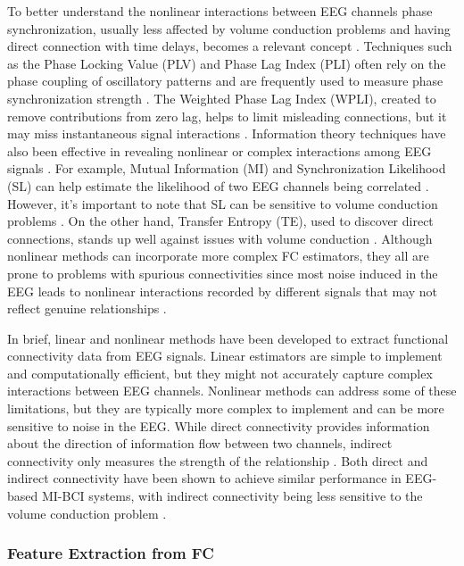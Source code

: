 To better understand the nonlinear interactions between EEG channels phase synchronization, usually less affected by volume conduction problems and having direct connection with time delays, becomes a relevant concept \cite{bastos2016tutorial}. Techniques such as the Phase Locking Value (PLV) and Phase Lag Index (PLI) often rely on the phase coupling of oscillatory patterns and are frequently used to measure phase synchronization strength \cite{siviero2023functional}. The Weighted Phase Lag Index (WPLI), created to remove contributions from zero lag, helps to limit misleading connections, but it may miss instantaneous signal interactions \cite{gonzalez2020network}. Information theory techniques have also been effective in revealing nonlinear or complex interactions among EEG signals \cite{jin2021novel}. For example, Mutual Information (MI) and Synchronization Likelihood (SL) can help estimate the likelihood of two EEG channels being correlated \cite{gonzalez2021network}. However, it's important to note that SL can be sensitive to volume conduction problems \cite{chiarion2023connectivity}. On the other hand, Transfer Entropy (TE), used to discover direct connections, stands up well against issues with volume conduction \cite{cao2022brain}. Although nonlinear methods can incorporate more complex FC estimators, they all are prone to problems with spurious connectivities since most noise induced in the EEG leads to nonlinear interactions recorded by different signals that may not reflect genuine relationships \cite{chiarion2023connectivity}.

In brief, linear and nonlinear methods have been developed to extract functional connectivity data from EEG signals. Linear estimators are simple to implement and computationally efficient, but they might not accurately capture complex interactions between EEG channels. Nonlinear methods can address some of these limitations, but they are typically more complex to implement and can be more sensitive to noise in the EEG. While direct connectivity provides information about the direction of information flow between two channels, indirect connectivity only measures the strength of the relationship \cite{gonzalez2020network}. Both direct and indirect connectivity have been shown to achieve similar performance in EEG-based MI-BCI systems, with indirect connectivity being less sensitive to the volume conduction problem \cite{cao2022effective}.

\subsubsection{Feature Extraction from FC}

